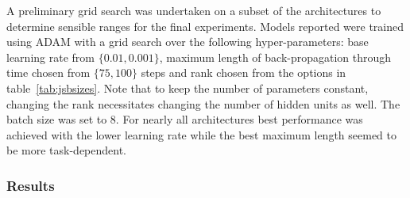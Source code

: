 A preliminary grid search was undertaken on a subset of the architectures to determine
sensible ranges for the final experiments. Models reported were trained using ADAM with
a grid search over the following hyper-parameters: base learning rate from \(\{0.01, 0.001\}\),
maximum length of back-propagation through time chosen from \(\{75, 100\}\) steps
and rank chosen from the options in table~\ref{tab:jsbsizes}. Note that to keep the number
of parameters constant, changing the rank necessitates changing the number of hidden units
as well. The batch size was set to \(8\). For nearly all architectures best performance was
achieved with the lower learning rate while the best maximum length seemed to be more task-dependent.

\subsubsection{Results}
